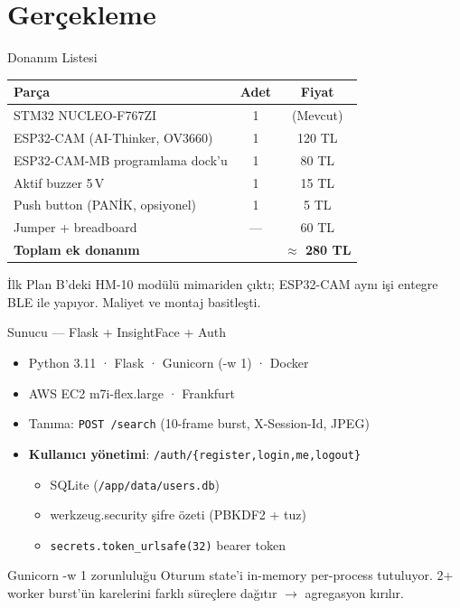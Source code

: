\documentclass[aspectratio=169,12pt]{beamer}
\begin{document}
\section{Gerçekleme}

\begin{frame}{Donanım Listesi}
    \small
    \begin{tabularx}{\linewidth}{X c c}
    \toprule
    \textbf{Parça} & \textbf{Adet} & \textbf{Fiyat}\\
    \midrule
    STM32 NUCLEO-F767ZI                & 1 & (Mevcut)\\
    ESP32-CAM (AI-Thinker, OV3660)     & 1 & 120 TL\\
    ESP32-CAM-MB programlama dock'u    & 1 & 80 TL\\
    Aktif buzzer 5\,V                  & 1 & 15 TL\\
    Push button (PANİK, opsiyonel)     & 1 & 5 TL\\
    Jumper + breadboard                & --- & 60 TL\\
    \midrule
    \textbf{Toplam ek donanım}         &   & \textbf{$\approx$ 280 TL} \\
    \bottomrule
    \end{tabularx}

    \vspace{0.4cm}
    İlk Plan B'deki HM-10 modülü mimariden çıktı; ESP32-CAM aynı işi
    entegre BLE ile yapıyor. Maliyet ve montaj basitleşti.
\end{frame}

\begin{frame}{Sunucu --- Flask + InsightFace + Auth}
    \begin{itemize}
        \item Python 3.11 · Flask · Gunicorn (-w 1) · Docker
        \item AWS EC2 m7i-flex.large · Frankfurt
        \item Tanıma: \texttt{POST /search}
              (10-frame burst, X-Session-Id, JPEG)
        \item \textbf{Kullanıcı yönetimi}: \texttt{/auth/\{register,login,me,logout\}}
            \begin{itemize}
                \item SQLite (\texttt{/app/data/users.db})
                \item werkzeug.security şifre özeti (PBKDF2 + tuz)
                \item \texttt{secrets.token\_urlsafe(32)} bearer token
            \end{itemize}
    \end{itemize}

    \vspace{0.3cm}
    \begin{exampleblock}{Gunicorn -w 1 zorunluluğu}
        Oturum state'i in-memory per-process tutuluyor. 2+ worker burst'ün
        karelerini farklı süreçlere dağıtır $\rightarrow$ agregasyon kırılır.
    \end{exampleblock}
\end{frame}
\end{document}

